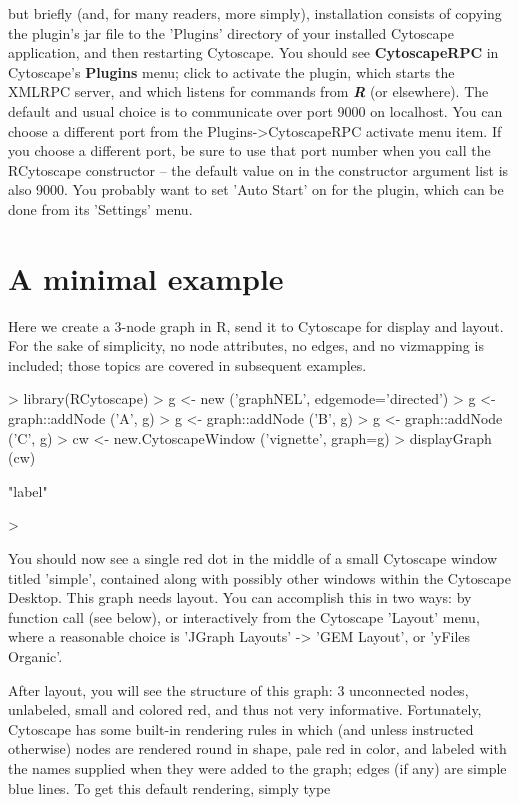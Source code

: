 \documentclass[12pt]{article}
\begin{document}
but briefly (and, for many readers, more simply), installation consists of copying the plugin's jar file to the 'Plugins' directory of your installed Cytoscape application, and then restarting Cytoscape.  You should see \textbf{CytoscapeRPC} in Cytoscape's \textbf{Plugins} menu; click to activate the plugin, which starts the XMLRPC server, and which listens for commands from \emph{\textbf{R}} (or elsewhere).  The default and usual choice is to communicate over port 9000 on localhost.  You can choose a different port from the Plugins->CytoscapeRPC activate menu item.  If you choose a different port, be sure to use that port number when you call the RCytoscape constructor -- the default value on in the constructor argument list is also 9000.  You probably want to set 'Auto Start' on for the plugin, which can be done from its 'Settings' menu.

\section{A minimal example}

Here we create a 3-node graph in R, send it to Cytoscape for display and layout.  For the sake of simplicity, no node attributes, no edges, and no vizmapping is included; those topics are covered in subsequent examples.

\begin{Schunk}
\begin{Sinput}
>   library(RCytoscape)
>   g <- new ('graphNEL', edgemode='directed')
>   g <- graph::addNode ('A', g)
>   g <- graph::addNode ('B', g)
>   g <- graph::addNode ('C', g)
>   cw <- new.CytoscapeWindow ('vignette', graph=g)
>   displayGraph (cw)
\end{Sinput}
\begin{Soutput}
[1] "label"
\end{Soutput}
\begin{Sinput}
> 
\end{Sinput}
\end{Schunk}

You should now see a single red dot in the middle of a small Cytoscape window titled 'simple', contained along with possibly
other windows within the Cytoscape Desktop.  This graph needs layout.  You can accomplish this in two ways:  by function call (see below), or interactively from the Cytoscape 'Layout' menu, where a reasonable choice is 'JGraph Layouts' -> 'GEM Layout', or 'yFiles Organic'.

After layout, you will see the structure of this graph:  3 unconnected nodes, unlabeled, small and colored red, and thus not very informative.  Fortunately, Cytoscape has some built-in rendering rules in which (and unless instructed otherwise) nodes are rendered round in shape, pale red in color, and labeled with the names supplied when they were added to the graph;  edges (if any) are simple blue lines. To get this default rendering, simply type
\end{document}

